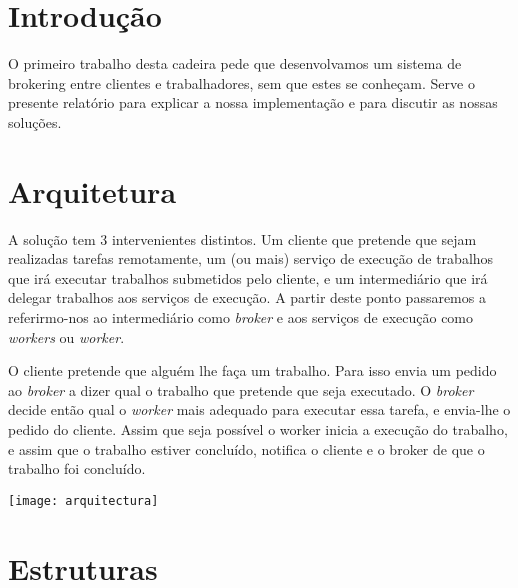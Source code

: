 \documentclass[a4paper]{article}
\begin{document}

\newpage
\thispagestyle{empty} %

\tableofcontents

\newpage
\setcounter{page}{1} %

\section{Introdução}

O primeiro trabalho desta cadeira pede que desenvolvamos um sistema de brokering entre clientes e trabalhadores, sem que estes se conheçam. Serve o presente relatório para
explicar a nossa implementação e para discutir as nossas soluções.

\section{Arquitetura}

A solução tem 3 intervenientes distintos. Um cliente que pretende que sejam realizadas tarefas remotamente, um (ou mais) serviço de execução de trabalhos que irá executar trabalhos submetidos pelo cliente, e um intermediário que irá delegar trabalhos aos serviços de execução. A partir deste ponto passaremos a referirmo-nos ao intermediário como \emph{broker} e aos serviços de execução como \emph{workers} ou \emph{worker}.

O cliente pretende que alguém lhe faça um trabalho. Para isso envia um pedido ao \emph{broker} a dizer qual o trabalho que pretende que seja executado. O \emph{broker} decide então qual o \emph{worker} mais adequado para executar essa tarefa, e envia-lhe o pedido do cliente. Assim que seja possível o worker inicia a execução do trabalho, e assim que o trabalho estiver concluído, notifica o cliente e o broker de que o trabalho foi concluído.


\medskip
\texttt{[image: arquitectura]}


\section{Estruturas}
\end{document}
